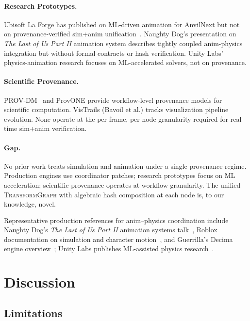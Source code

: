 \documentclass[sigconf,nonacm]{acmart}
\newcommand{\transformgraph}{\textsc{TransformGraph}}
\begin{document}
\paragraph{Research Prototypes.}
Ubisoft La Forge has published on ML-driven animation for
AnvilNext but not on provenance-verified sim+anim
unification~\cite{anvilnext-anim-arch}. Naughty Dog's
presentation on \emph{The Last of Us Part II} animation
system describes tightly coupled anim-physics integration
but without formal contracts or hash verification.
Unity Labs' physics-animation research focuses on
ML-accelerated solvers, not on provenance.

\paragraph{Scientific Provenance.}
PROV-DM~\cite{prov-dm-w3c} and ProvONE provide workflow-level
provenance models for scientific computation. VisTrails
(Bavoil et al.) tracks visualization pipeline evolution.
None operate at the per-frame, per-node granularity required
for real-time sim+anim verification.

\paragraph{Gap.}
No prior work treats simulation and animation under a single
provenance regime. Production engines use coordinator patches;
research prototypes focus on ML acceleration; scientific
provenance operates at workflow granularity. The unified
\transformgraph{} with algebraic hash composition at each
node is, to our knowledge, novel.

Representative production references for anim--physics coordination
include Naughty Dog's \emph{The Last of Us Part II} animation
systems talk~\cite{nd-tlou2-gdc2020}, Roblox documentation on
simulation and character motion~\cite{roblox-physics-overview2024},
and Guerrilla's Decima engine overview~\cite{guerrilla-decima2017};
Unity Labs publishes ML-assisted physics
research~\cite{unity-labs-dice2020}.

\section{Discussion}
\label{sec:discussion}

\subsection{Limitations}
\end{document}
